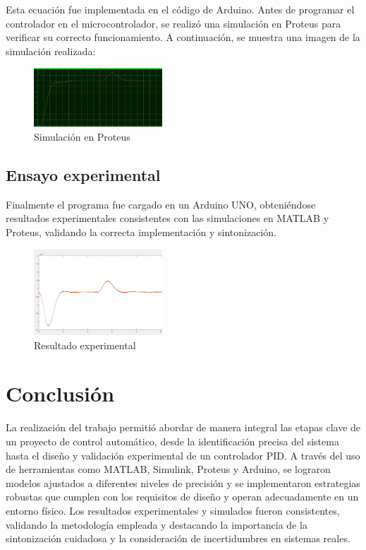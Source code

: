 \documentclass[letterpaper, 10 pt, conference]{ieeeconf}  %
\begin{document}
Esta ecuación fue implementada en el código de Arduino. 
Antes de programar el controlador en el microcontrolador, se realizó una simulación en Proteus para verificar su correcto funcionamiento. A continuación, se muestra una imagen de la simulación realizada:

\begin{figure}[H]
  \centering
  \includegraphics[width=0.43\textwidth]{./IMAGENES/pid7.png}
  \caption{Simulación en Proteus}
  \label{fig:pid7}
\end{figure}

\subsection{Ensayo experimental}

Finalmente el programa fue cargado en un Arduino UNO, obteniéndose resultados experimentales consistentes con las simulaciones en MATLAB y Proteus, validando la correcta implementación y sintonización.

\begin{figure}[H]
  \centering
  \includegraphics[width=0.43\textwidth]{./IMAGENES/pid8.png}
  \caption{Resultado experimental}
  \label{fig:pid8}
\end{figure}

\section{Conclusión}

La realización del trabajo permitió abordar de manera integral las etapas clave de un proyecto de control automático, desde la identificación precisa del sistema hasta el diseño y validación experimental de un controlador PID. A través del uso de herramientas como MATLAB, Simulink, Proteus y Arduino, se lograron modelos ajustados a diferentes niveles de precisión y se implementaron estrategias robustas que cumplen con los requisitos de diseño y operan adecuadamente en un entorno físico. Los resultados experimentales y simulados fueron consistentes, validando la metodología empleada y destacando la importancia de la sintonización cuidadosa y la consideración de incertidumbres en sistemas reales.
\end{document}
